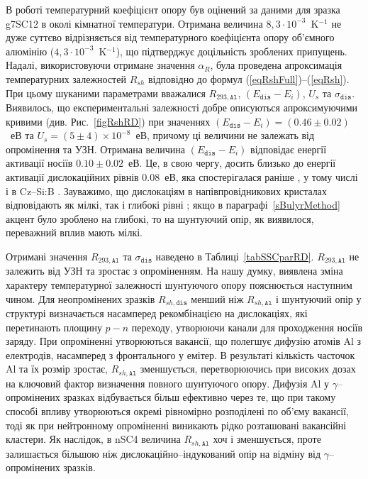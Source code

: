 В роботі температурний коефіцієнт опору був оцінений за даними для зразка g7SC12 в околі кімнатної температури.
Отримана величина $8,3\cdot10^{-3}$~K$^{-1}$ не дуже суттєво відрізняється від температурного
коефіцієнта опору об'ємного алюмінію ($4,3\cdot10^{-3}$~K$^{-1}$),
що підтверджує доцільність зроблених припущень.
Надалі, використовуючи отримане значення $\alpha_R$, була
проведена апроксимація температурних залежностей $R_{sh}$ відповідно до формул (\ref{eqRshFull})--(\ref{eqRsh}).
При цьому шуканими параметрами вважалися $R_{293,\mathtt{Al}}$, $(E_{\mathtt{dis}}-E_i)$, $U_s$ та $\sigma_{\mathtt{dis}}$.
Виявилось, що експериментальні залежності добре описуються апроксимуючими кривими (див. Рис.~\ref{figRshRD})
при значеннях $(E_{\mathtt{dis}}-E_i)=(0.46\pm0.02)$~еВ та $U_s=(5\pm4)\times10^{-8}$~еВ,
причому ці величини не залежать від опромінення та УЗН.
Отримана величина $(E_{\mathtt{dis}}-E_i)$ відповідає енергії активації носіїв $0.10\pm0.02$~еВ.
Це, в свою чергу, досить близько до енергії активації дислокаційних рівнів $0.08$~еВ,
яка спостерігалася раніше \cite{disl10:Castaldini,disl10:Isakova,disl10:Yur,disl10:Kveder,disl10:Trushin,Si:disl},
у тому числі і в Cz--Si:B \cite{disl10:Castaldini,disl10:Isakova,disl10:Yu}.
Зауважимо, що дислокаціям в напівпровідникових кристалах відповідають як мілкі,
так і глибокі рівні \cite{Disl:GaN};
якщо в параграфі~\ref{sBulyrMethod} акцент було зроблено на глибокі, то на шунтуючий опір, як виявилося,
переважний вплив мають мілкі.


Отримані значення $R_{293,\mathtt{Al}}$ та $\sigma_{\mathtt{dis}}$ наведено в Таблиці~\ref{tabSSCparRD}.
$R_{293,\mathtt{Al}}$ не залежить від УЗН та зростає з опроміненням.
На нашу думку, виявлена зміна характеру температурної залежності шунтуючого опору пояснюється
наступним чином.
Для неопромінених зразків $R_{sh,\mathtt{dis}}$ менший ніж $R_{sh,\mathtt{Al}}$ і шунтуючий опір
у структурі визначається насамперед рекомбінацією на дислокаціях, які перетинають площину $p-n$ переходу,
утворюючи канали для проходження носіїв заряду.
При опроміненні утворюються вакансії, що полегшує дифузію атомів Al з електродів, насамперед з фронтального у емітер.
В результаті кількість часточок Al та їх розмір зростає, $R_{sh,\mathtt{Al}}$ зменшується,
перетворюючись при високих дозах на ключовий фактор визначення повного шунтуючого опору.
Дифузія Al у $\gamma$--опромінених зразках відбувається більш ефективно через те, що
 при такому способі впливу утворюються окремі рівномірно розподілені по об'єму вакансії, тоді
 як при нейтронному опроміненні виникають рідко розташовані вакансійні кластери.
Як наслідок, в nSC4 величина $R_{sh,\mathtt{Al}}$ хоч і зменшується, проте залишається
більшою ніж дислокаційно--індукований опір на відміну від $\gamma$--опромінених зразків.

